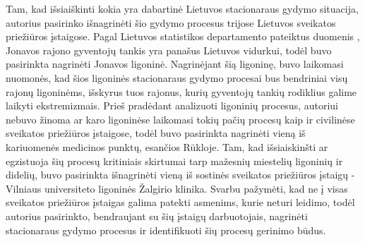 Tam, kad išsiaiškinti kokia yra dabartinė Lietuvos stacionaraus gydymo situacija, autorius pasirinko išnagrinėti šio gydymo procesus trijose Lietuvos sveikatos priežiūros įstaigose. Pagal Lietuvos statistikos departamento pateiktus duomenis \cite{Gyvento2017}, Jonavos rajono gyventojų tankis yra panašus Lietuvos vidurkui, todėl buvo pasirinkta nagrinėti Jonavos ligoninė. Nagrinėjant šią ligoninę, buvo laikomasi nuomonės, kad šios ligoninės stacionaraus gydymo procesai bus bendriniai visų rajonų ligoninėms, išskyrus tuos rajonus, kurių gyventojų tankių rodiklius galime laikyti ekstremizmais. Prieš pradėdant analizuoti ligoninių procesus, autoriui nebuvo žinoma ar karo ligoninėse laikomasi tokių pačių procesų kaip ir civilinėse sveikatos priežiūros įstaigose, todėl buvo pasirinkta nagrinėti vieną iš kariuomenės medicinos punktų, esančios Rūkloje. Tam, kad išsiaiskinšti ar egzistuoja šių procesų kritiniais skirtumai tarp mažesnių miestelių ligoninių ir didelių, buvo pasirinkta išnagrinėti vieną iš sostinės sveikatos priežiūros įstaigų - Vilniaus universiteto ligoninės Žalgirio klinika. Svarbu pažymėti, kad ne į visas sveikatos priežiūros įstaigas galima patekti asmenims, kurie neturi leidimo, todėl autorius pasirinkto, bendraujant su šių įstaigų darbuotojais, nagrinėti stacionaraus gydymo procesus ir identifikuoti šių procesų gerinimo būdus.

